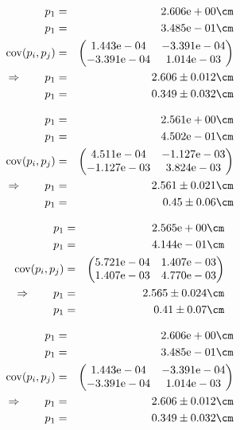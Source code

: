 \begin{eqnarray}
    p_1 &=& 2.606\mathrm{e}+00 \cm \nonumber \\
    p_1 &=& 3.485\mathrm{e}-01 \cm \nonumber \\
    \mathrm{cov}(p_i, p_j) &=& 
    \begin{pmatrix}
        1.443\mathrm{e}-04 &-3.391\mathrm{e}-04 \\
        -3.391\mathrm{e}-04 &1.014\mathrm{e}-03 \\
    \end{pmatrix}
\\ \Rightarrow \qquad
    p_1 &=& 2.606 \pm 0.012 \cm\\
    p_1 &=& 0.349 \pm 0.032 \cm
\end{eqnarray}

\begin{eqnarray}
    p_1 &=& 2.561\mathrm{e}+00 \cm \nonumber \\
    p_1 &=& 4.502\mathrm{e}-01 \cm \nonumber \\
    \mathrm{cov}(p_i, p_j) &=& 
    \begin{pmatrix}
        4.511\mathrm{e}-04 &-1.127\mathrm{e}-03 \\
        -1.127\mathrm{e}-03 &3.824\mathrm{e}-03 \\
    \end{pmatrix}
\\ \Rightarrow \qquad
    p_1 &=& 2.561 \pm 0.021 \cm\\
    p_1 &=& 0.45 \pm 0.06 \cm
\end{eqnarray}

\begin{eqnarray}
    p_1 &=& 2.565\mathrm{e}+00 \cm \nonumber \\
    p_1 &=& 4.144\mathrm{e}-01 \cm \nonumber \\
    \mathrm{cov}(p_i, p_j) &=& 
    \begin{pmatrix}
        5.721\mathrm{e}-04 &1.407\mathrm{e}-03 \\
        1.407\mathrm{e}-03 &4.770\mathrm{e}-03 \\
    \end{pmatrix}
\\ \Rightarrow \qquad
    p_1 &=& 2.565 \pm 0.024 \cm\\
    p_1 &=& 0.41 \pm 0.07 \cm
\end{eqnarray}

\begin{eqnarray}
    p_1 &=& 2.606\mathrm{e}+00 \cm \nonumber \\
    p_1 &=& 3.485\mathrm{e}-01 \cm \nonumber \\
    \mathrm{cov}(p_i, p_j) &=& 
    \begin{pmatrix}
        1.443\mathrm{e}-04 &-3.391\mathrm{e}-04 \\
        -3.391\mathrm{e}-04 &1.014\mathrm{e}-03 \\
    \end{pmatrix}
\\ \Rightarrow \qquad
    p_1 &=& 2.606 \pm 0.012 \cm\\
    p_1 &=& 0.349 \pm 0.032 \cm
\end{eqnarray}


